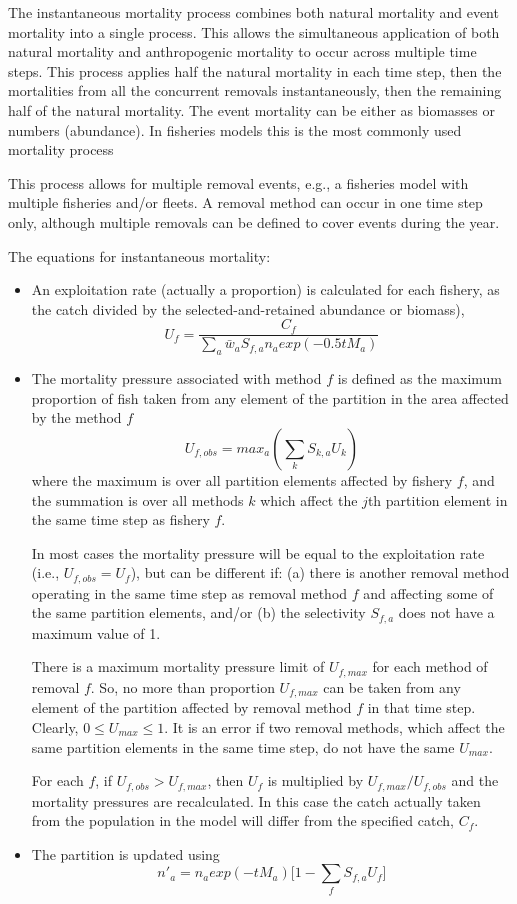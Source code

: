 The instantaneous mortality process combines both natural mortality and event mortality into a single process. This allows the simultaneous application of both natural mortality and anthropogenic mortality to occur across multiple time steps. This process applies half the natural mortality in each time step, then the mortalities from all the concurrent removals instantaneously, then the remaining half of the natural mortality. The event mortality can be either as biomasses or numbers (abundance). In fisheries models this is the most commonly used mortality process

This process allows for multiple removal events, e.g., a fisheries model with multiple fisheries and/or fleets. A removal method can occur in one time step only, although multiple removals can be defined to cover events during the year.

The equations for instantaneous mortality:


\begin{itemize}
	\item An exploitation rate (actually a proportion) is calculated for each fishery, as the catch divided by the selected-and-retained abundance or biomass),
	$$ U_f = \frac{C_f}{\sum_a \bar{w}_a S_{f,a} n_a exp(-0.5 t M_a)}$$
	\item The mortality pressure associated with method $f$ is defined as the maximum proportion of fish taken from any element of the partition in the area affected by the method $f$
	$$ U_{f,obs} = max_a(\sum_k S_{k,a} U_k) $$
	where the maximum is over all partition elements affected by fishery $f$, and the summation is over all methods $k$ which affect the $j$th partition element in the same time step as fishery $f$.

	In most cases the mortality pressure will be equal to the exploitation rate (i.e., $U_{f,obs} = U_f$), but can be different if: (a) there is another removal method operating in the same time step as removal method $f$ and affecting some of the same partition elements, and/or (b) the selectivity $S_{f,a}$ does not have a maximum value of 1.

	There is a maximum mortality pressure limit of $U_{f,max}$ for each method of removal $f$. So, no more than proportion $U_{f,max}$ can be taken from any element of the partition affected by removal method $f$ in that time step. Clearly, $0 \leq U_{max} \leq 1$. It is an error if two removal methods, which affect the same partition elements in the same time step, do not have the same $U_{max}$.

	For each $f$, if $U_{f,obs} > U_{f,max}$, then $U_f$ is multiplied by $U_{f,max}/U_{f,obs}$ and the mortality pressures are recalculated. In this case the catch actually taken from the population in the model will differ from the specified catch, $C_f$.

	\item The partition is updated using
		$$ n'_a = n_a exp(-tM_a)\big[1 - \sum_f S_{f,a} U_f \big] $$
\end{itemize}

